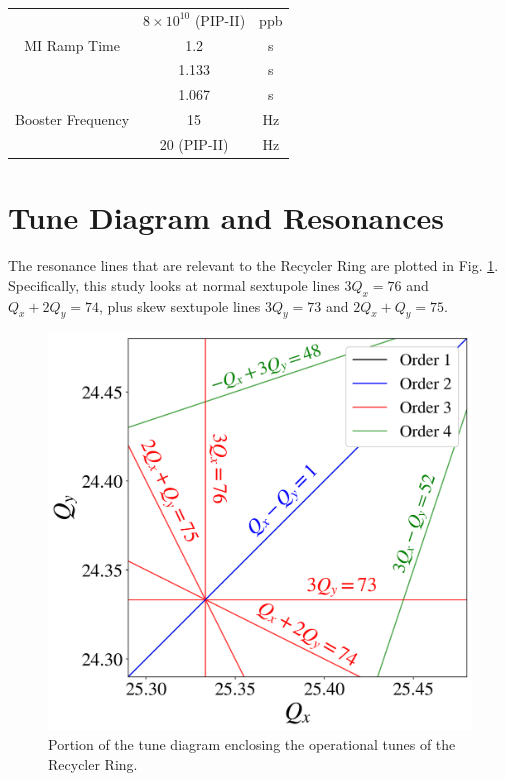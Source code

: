 \begin{table}[H]
\begin{tabular}{@{}ccc@{}}
                               & $8\times10^{10}$ (PIP-II)                  & ppb           \\
   MI Ramp Time                & 1.2                                        & s             \\
                               & 1.133                                      & s             \\
                               & 1.067                                      & s             \\
   Booster Frequency           & 15                                         & Hz            \\
                               & 20 (PIP-II)                                & Hz            \\ \bottomrule
   \end{tabular}
   \end{table}

\section{Tune Diagram and Resonances}

The resonance lines that are relevant to the Recycler Ring are plotted in Fig. \ref{fig:rrtd}. Specifically, this study looks at normal sextupole lines $3 Q_x=76$ and $Q_x+2Q_y=74$, plus skew sextupole lines $3 Q_y=73$ and $2 Q_x+Q_y=75$.

\begin{figure}[H]
   \centering
   \includegraphics[width=\columnwidth]{chapter3/rrtd.png}
   \caption{Portion of the tune diagram enclosing the operational tunes of the Recycler Ring.}
   \label{fig:rrtd}
\end{figure}

